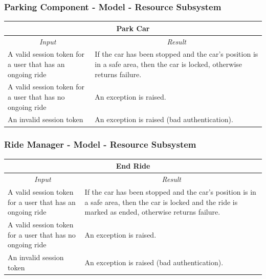 \documentclass[english]{article}
\begin{document}
\newpage
\subsubsection{Parking Component - Model - Resource Subsystem}

\begin{center}
	\begin{tabular}{ | p{6cm} | p{6cm} | }
		\hline 
		\multicolumn{2}{|c|}{\textbf{Park Car}} \\
		\hline
		\multicolumn{1}{|c|}{\textit{Input}} & \multicolumn{1}{c|}{\textit{Result}} \\
		\hline
		A valid session token for a user that has an ongoing ride  & If the car has been stopped and the car's position is in a safe area, then the car is locked, otherwise returns failure. \\
		\hline
		A valid session token for a user that has no ongoing ride &  An exception is raised. \\
		\hline
		An invalid session token & An exception is raised (bad authentication). \\
		\hline
	\end{tabular}
\end{center}

\subsubsection{Ride Manager - Model - Resource Subsystem}

\begin{center}
	\begin{tabular}{ | p{6cm} | p{6cm} | }
		\hline 
		\multicolumn{2}{|c|}{\textbf{End Ride}} \\
		\hline
		\multicolumn{1}{|c|}{\textit{Input}} & \multicolumn{1}{c|}{\textit{Result}} \\
		\hline
		A valid session token for a user that has an ongoing ride  & If the car has been stopped and the car's position is in a safe area, then the car is locked and the ride is marked as ended, otherwise returns failure. \\
		\hline
		A valid session token for a user that has no ongoing ride &  An exception is raised. \\
		\hline
		An invalid session token & An exception is raised (bad authentication). \\
		\hline
	\end{tabular}
\end{center}
\end{document}
